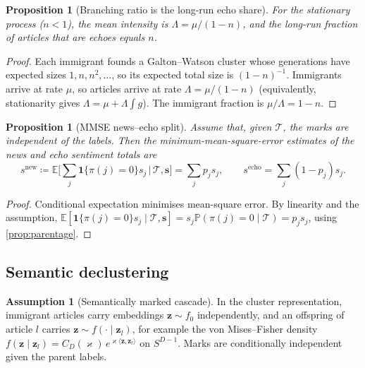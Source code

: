 \documentclass{article}
\theoremstyle{plain}
\newtheorem{proposition}[theorem]{Proposition}
\theoremstyle{definition}
\newtheorem{assumption}{Assumption}
\theoremstyle{remark}
\newcommand{\E}{\mathbb{E}}
\newcommand{\Prob}{\mathbb{P}}
\newcommand{\z}{\bm{z}}
\newcommand{\ind}{\mathbf{1}}
\begin{document}
\begin{proposition}[Branching ratio is the long-run echo share]\label{prop:branching}
For the stationary process ($n<1$), the mean intensity is $\Lambda=\mu/(1-n)$, and the long-run fraction of articles that are echoes equals $n$.
\end{proposition}
\begin{proof}
Each immigrant founds a Galton--Watson cluster whose generations have expected sizes $1,n,n^2,\dots$, so its expected total size is $(1-n)^{-1}$. Immigrants arrive at rate $\mu$, so articles arrive at rate $\Lambda=\mu/(1-n)$ (equivalently, stationarity gives $\Lambda=\mu+\Lambda\int g$). The immigrant fraction is $\mu/\Lambda=1-n$.
\end{proof}
\begin{proposition}[MMSE news--echo split]\label{prop:mmse}
Assume that, given $\mathcal{T}$, the marks are independent of the labels. Then the minimum-mean-square-error estimates of the news and echo sentiment totals are
\[
  s^{\text{new}}\coloneqq\E\Big[\sum_j\ind\{\pi(j)=0\}s_j\,\Big|\,\mathcal{T},\bm s\Big]=\sum_j p_j s_j,\qquad
  s^{\text{echo}}=\sum_j(1-p_j)s_j .
\]
\end{proposition}
\begin{proof}
Conditional expectation minimises mean-square error. By linearity and the assumption, $\E[\ind\{\pi(j)=0\}s_j\mid\mathcal{T},\bm s]=s_j\Prob(\pi(j)=0\mid\mathcal{T})=p_js_j$, using \cref{prop:parentage}.
\end{proof}

\subsection{Semantic declustering}
\begin{assumption}[Semantically marked cascade]\label{ass:marked}
In the cluster representation, immigrant articles carry embeddings $\z\sim f_0$ independently, and an offspring of article $l$ carries $\z\sim f(\cdot\mid\z_l)$, for example the von Mises--Fisher density $f(\z\mid\z_l)=C_D(\varkappa)\,e^{\varkappa\langle\z,\z_l\rangle}$ on $S^{D-1}$. Marks are conditionally independent given the parent labels.
\end{assumption}
\end{document}
